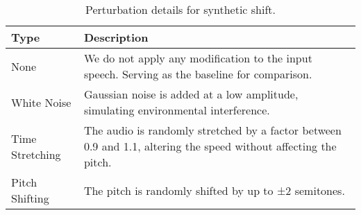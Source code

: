 \begin{table*}[!ht]
\centering
\begin{tabular}{p{3cm}p{12cm}}
\toprule
Type            & Description                                                                                                      \\ \midrule
None            & We do not apply any modification to the input speech. Serving as the baseline for comparison.                    \\
White Noise     & Gaussian noise is added at a low amplitude, simulating environmental interference.                               \\
Time Stretching & The audio is randomly stretched by a factor between 0.9 and 1.1, altering the speed without affecting the pitch. \\
Pitch Shifting  & The pitch is randomly shifted by up to ±2 semitones.   

\\ \bottomrule
\end{tabular}
\caption{Perturbation details for synthetic shift.}
\label{tab:noise_details}
\end{table*}